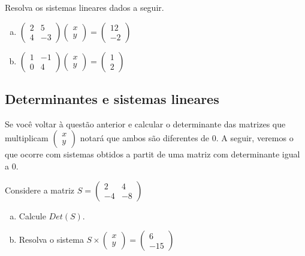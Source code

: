 \documentclass[main_estudante.tex]{subfiles}
\begin{document}
\begin{questao}
Resolva os sistemas lineares dados a seguir.
\begin{enumerate}[a)]
\item $\begin{pmatrix}2 & 5 \\ 4 & -3\end{pmatrix} \begin{pmatrix}x \\ y\end{pmatrix} = \begin{pmatrix}12 \\ -2\end{pmatrix}$
\item $\begin{pmatrix}1 & -1 \\ 0 & 4\end{pmatrix} \begin{pmatrix}x \\ y\end{pmatrix} = \begin{pmatrix}1 \\ 2\end{pmatrix}$
\end{enumerate}
\end{questao}

\subsection*{Determinantes e sistemas lineares}

Se você voltar à questão anterior e calcular o determinante das matrizes que multiplicam $\begin{pmatrix}x \\ y\end{pmatrix}$ notará que ambos são diferentes de 0. A seguir, veremos o que ocorre com sistemas obtidos a partit de uma matriz com determinante igual a 0.

\begin{questao}
Considere a matriz $S=\begin{pmatrix}2 & 4 \\ -4 & -8\end{pmatrix}$
\begin{enumerate}[a)]
\item Calcule $Det(S)$.
\item Resolva o sistema $S \times \begin{pmatrix}x \\ y\end{pmatrix} = \begin{pmatrix}6 \\ -15\end{pmatrix}$
\end{enumerate}
\end{questao}
\end{document}
